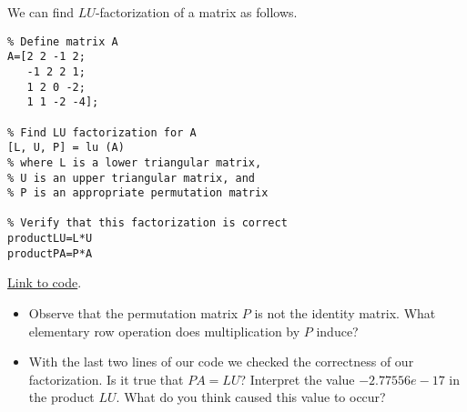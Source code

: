 \documentclass{ximera}
\begin{document}
\begin{template}\label{temp:LU}
We can find $LU$-factorization of a matrix as follows.  

\begin{verbatim}
% Define matrix A
A=[2 2 -1 2;
   -1 2 2 1;
   1 2 0 -2;
   1 1 -2 -4];
   
% Find LU factorization for A   
[L, U, P] = lu (A)
% where L is a lower triangular matrix,
% U is an upper triangular matrix, and
% P is an appropriate permutation matrix

% Verify that this factorization is correct
productLU=L*U
productPA=P*A
\end{verbatim}

\href{https://sagecell.sagemath.org/?z=eJxtjrFqwzAURXeB_-EugTbYEJtuxYOgdNLgRV1CBmHLjcCRxKtEmn59n-y0UCgC8Y507uPu8GJn5y0uJpH7hKyE7I8dOjQtuudKAOvEp92owAFN90Mtz2ieThtXYodX5ycojdmMKZD7MskFjzkQ5GocVQ1dYzihx5LxIB9L6nq2ZKHgPmCwhKslcCPj3_Ni6F6vLqJeFY8c478O_03FG-6eiZFCZC1ZcOKS01Zo0ytR3DdLbr4hnU3ii3N_u_PDGIjsmCrBy6Y8JqV7tde_OMh-2Mtvdaxh4w==&lang=octave&interacts=eJyLjgUAARUAuQ==}{Link to code}.

\begin{remark}
\begin{itemize}
\item Observe that the permutation matrix $P$ is not the identity matrix.  What elementary row operation does multiplication by $P$ induce?
    \item With the last two lines of our code we checked the correctness of our factorization.  Is it true that $PA=LU$?  Interpret the value $-2.77556e-17$ in the product $LU$.  What do you think caused this value to occur?  
\end{itemize}
    \end{remark}
    
\end{template}
\end{document}
